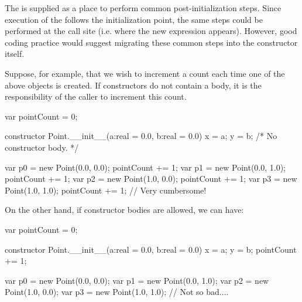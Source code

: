 \begin{rationale}
The  is supplied as a place to perform common
post-initialization steps.  Since execution of the 
follows the initialization point, the same steps could be performed at the call
site (i.e. where the new expression appears).  However, good coding practice
would suggest migrating these common steps into the constructor itself.

Suppose, for example, that we wish to increment a count each time one
of the above  objects is created.  If constructors do not contain
a body, it is the responsibility of the caller to increment this count.
\begin{chapel}
var pointCount = 0;

constructor Point.__init__(a:real = 0.0, b:real = 0.0)
{ x = a; y = b; }
{ /* No constructor body. */ }

var p0 = new Point(0.0, 0.0);
pointCount += 1;
var p1 = new Point(0.0, 1.0);
pointCount += 1;
var p2 = new Point(1.0, 0.0);
pointCount += 1;
var p3 = new Point(1.0, 1.0);
pointCount += 1;
// Very cumbersome!
\end{chapel}

On the other hand, if constructor bodies are allowed, we can have:
\begin{chapel}
var pointCount = 0;

constructor Point.__init__(a:real = 0.0, b:real = 0.0)
{ x = a; y = b; }
{ pointCount += 1; }

var p0 = new Point(0.0, 0.0);
var p1 = new Point(0.0, 1.0);
var p2 = new Point(1.0, 0.0);
var p3 = new Point(1.0, 1.0);
// Not so bad....
\end{chapel}
\end{rationale}

